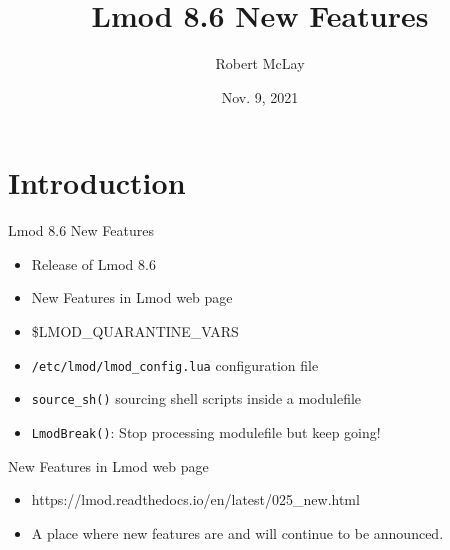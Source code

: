 \documentclass{beamer}
\begin{document}
\title[Lmod]{Lmod 8.6 New Features}
\author{Robert McLay} 
\date{Nov. 9, 2021}

\frame{\titlepage} 

\section{Introduction}

\begin{frame}{Lmod 8.6 New Features}
  \begin{itemize}
    \item Release of Lmod 8.6
    \item New Features in Lmod web page
    \item \$LMOD\_QUARANTINE\_VARS
    \item \texttt{/etc/lmod/lmod\_config.lua} configuration file
    \item \texttt{source\_sh()} sourcing shell scripts inside a
      modulefile
    \item \texttt{LmodBreak()}: Stop processing modulefile but keep
      going!
  \end{itemize}
\end{frame}

\begin{frame}{New Features in Lmod web page}
  \begin{itemize}
    \item https://lmod.readthedocs.io/en/latest/025_new.html
    \item A place where new features are and will continue to be announced.
  \end{itemize}
\end{frame}
\end{document}
